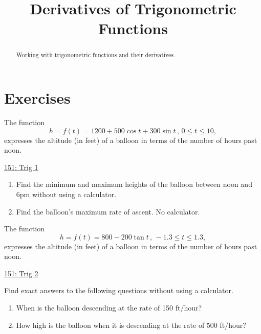 \documentclass{ximera}
\title{Derivatives of Trigonometric Functions}
\begin{document}
\begin{abstract}
Working with trigonometric functions and their derivatives.
\end{abstract}
\maketitle


\section{Exercises}

\begin{question}  \label{Qdfethnnjjjuu}
The function
\[
    h = f(t) = 1200 + 500\cos t + 300\sin t \, , \, 0\leq t \leq 10 ,
\]
expresses the altitude (in feet) of a balloon in terms of the number of hours past noon.

\begin{onlineOnly}
    \begin{center}
\end{center}
\end{onlineOnly}

\href{https://www.desmos.com/calculator/f1ldi6yrek}{151: Trig 1}

\begin{enumerate}

\item Find the minimum and maximum heights of the balloon between noon and 6pm without using a calculator.

\item Find the balloon's maximum rate of ascent. No calculator.

\end{enumerate}

\end{question}

\begin{question}  \label{Q:LKJMFJUFegvt4}
The function
\[
       h = f(t) = 800 - 200 \tan t \, , \, -1.3\leq t\leq 1.3,
\]
expresses the altitude (in feet) of a balloon in terms of the number of hours past noon.

\begin{onlineOnly}
    \begin{center}
\end{center}
\end{onlineOnly}

\href{https://www.desmos.com/calculator/re6nqofgs0}{151: Trig 2}

Find exact answers to the following questions without using a calculator.


\begin{enumerate}
\item When is the balloon descending at the rate of 150 ft/hour?

\item How high is the balloon when it is descending at the rate of $500$ ft/hour?

\end{enumerate}

\end{question}
\end{document}
